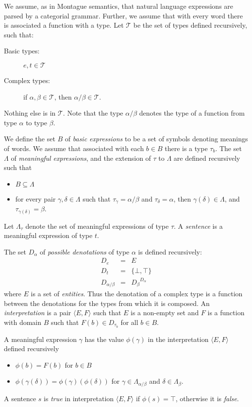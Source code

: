 \documentclass[letterpaper]{article}
\begin{document}
We assume, as in Montague semantics, that natural language expressions
are parsed by a categorial grammar. Further, we assume that with every word there is
associated a function with a type. Let $\mathcal{T}$ be the set of types defined
recursively, such that:
\begin{description}
\item [Basic types:] $e,t\in \mathcal{T}$
\item[Complex types:]  if $\alpha, \beta\in \mathcal{T}$, then $\alpha/\beta\in \mathcal{T}$.
\end{description}
Nothing else is in $\mathcal{T}$. Note that the type $\alpha/\beta$ denotes the type of a function from type
$\alpha$ to type $\beta$.

We define the set $B$ of \emph{basic expressions} to be a set of
symbols denoting meanings of words. We assume that associated with
each $b\in B$ there is a type $\tau_b$. The set $\Lambda$ of
\emph{meaningful expressions}, and the extension of $\tau$ to $\Lambda$ are
defined recursively such that
\begin{itemize}
\item $B\subseteq \Lambda$
\item for every pair $\gamma,\delta\in \Lambda$ such that $\tau_\gamma
  = \alpha/\beta$ and $\tau_\delta = \alpha$, then $\gamma(\delta)\in
  \Lambda$, and $\tau_{\gamma(\delta)} = \beta$.
\end{itemize}
Let $\Lambda_\tau$ denote the set of meaningful expressions of type
$\tau$. A \emph{sentence} is a meaningful expression of type $t$.


The set $D_\alpha$ of \emph{possible denotations} of type $\alpha$ is
defined recursively:
\begin{eqnarray*}
D_e &=& E\\
D_t &=& \{\bot,\top\}\\
D_{\alpha/\beta} &=& {D_\beta}^{D_\alpha}
\end{eqnarray*}
where $E$ is a set of \emph{entities}. Thus the denotation of a
complex type is a function between the denotations for the types from
which it is composed. An \emph{interpretation} is a pair $\langle E,
F\rangle$ such that $E$ is a non-empty set and $F$ is a function with
domain $B$ such that $F(b) \in D_{\tau_b}$ for all $b\in B$.

A meaningful expression $\gamma$ has the value $\phi(\gamma)$ in the
interpretation $\langle E, F\rangle$ defined recursively
\begin{itemize}
\item $\phi(b) = F(b)$ for $b\in B$
\item $\phi(\gamma(\delta)) = \phi(\gamma)(\phi(\delta))$ for $\gamma
  \in \Lambda_{\alpha/\beta}$ and $\delta \in \Lambda_\beta$.
\end{itemize}
A sentence $s$ is \emph{true} in interpretation $\langle E, F\rangle$
if $\phi(s) = \top$, otherwise it is \emph{false}.
\end{document}
